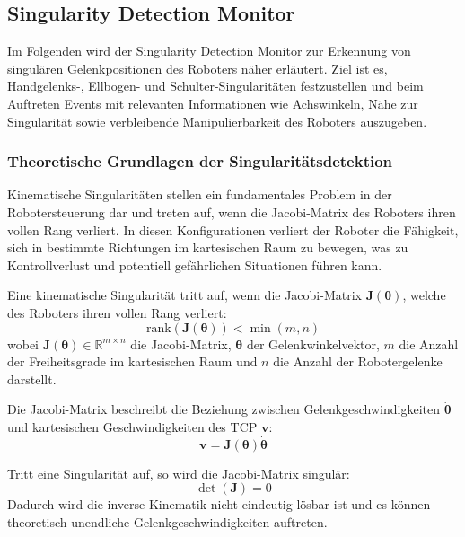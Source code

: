 \subsection{Singularity Detection Monitor} \label{ssec:Singularitaeten}
Im Folgenden wird der Singularity Detection Monitor zur Erkennung von
singulären Gelenkpositionen des Roboters näher erläutert. Ziel ist es,
Handgelenks-, Ellbogen- und Schulter-Singularitäten festzustellen und beim
Auftreten Events mit relevanten Informationen wie Achswinkeln, Nähe zur
Singularität sowie verbleibende Manipulierbarkeit des Roboters auszugeben.

\subsubsection{Theoretische Grundlagen der Singularitätsdetektion}
\label{sssec:Theorie_Singularitaeten}
Kinematische Singularitäten stellen ein fundamentales Problem in der
Robotersteuerung dar und treten auf, wenn die Jacobi-Matrix des Roboters ihren
vollen Rang verliert. In diesen Konfigurationen verliert der Roboter die
Fähigkeit, sich in bestimmte Richtungen im kartesischen Raum zu bewegen, was zu
Kontrollverlust und potentiell gefährlichen Situationen führen
kann.

Eine kinematische Singularität tritt auf,
wenn die Jacobi-Matrix $\mathbf{J}(\boldsymbol{\theta})$, welche des Roboters
ihren vollen Rang verliert:
\begin{equation}
  \text{rank}(\mathbf{J}(\boldsymbol{\theta})) < \min(m, n)
  \label{eq:singularity_condition}
\end{equation} wobei
$\mathbf{J}(\boldsymbol{\theta}) \in \mathbb{R}^{m \times n}$ die Jacobi-Matrix,
$\boldsymbol{\theta}$ der Gelenkwinkelvektor, $m$ die Anzahl der Freiheitsgrade
im kartesischen Raum und $n$ die Anzahl der Robotergelenke darstellt.

Die Jacobi-Matrix beschreibt die Beziehung zwischen Gelenkgeschwindigkeiten
$\dot{\boldsymbol{\theta}}$ und kartesischen Geschwindigkeiten des TCP
$\mathbf{v}$:
\begin{equation} \mathbf{v} = \mathbf{J}(\boldsymbol{\theta})
  \dot{\boldsymbol{\theta}} \label{eq:jacobian_velocity}
\end{equation}

Tritt eine Singularität auf, so wird die Jacobi-Matrix singulär:
\begin{equation} \det(\mathbf{J}) = 0 \label{eq:jacobian_singularity}
\end{equation} Dadurch wird die inverse Kinematik nicht
eindeutig lösbar ist und es können theoretisch unendliche
Gelenkgeschwindigkeiten auftreten.


